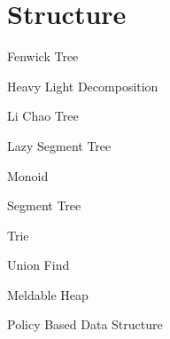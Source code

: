 \section{Structure}

Fenwick Tree


Heavy Light Decomposition


Li Chao Tree


Lazy Segment Tree





Monoid


Segment Tree


Trie


Union Find


Meldable Heap


Policy Based Data Structure


